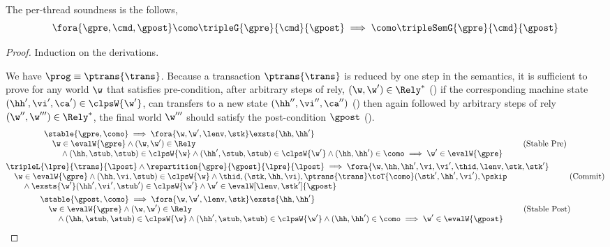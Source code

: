 \begin{thm}
\label{thm:per-thread-soundness}
The per-thread soundness is the follows,
\[
    \fora{\gpre, \cmd, \gpost}
    \como \tripleG{\gpre}{\cmd}{\gpost} 
    \implies 
    \como \tripleSemG{\gpre}{\cmd}{\gpost} 
\]
\end{thm}
\begin{proof}
Induction on the derivations.


We have \( \prog \equiv \ptrans{\trans} \).
Because a transaction \( \ptrans{\trans} \) is reduced by one step in the semantics, it is sufficient to prove for any world \(\w\) that satisfies pre-condition, after arbitrary steps of rely, \ie \( (\w, \w') \in \Rely^{*} \) () if the corresponding machine state \((\hh',\vi', \ca') \in \clpsW{\w'}\), can transfers to a new state \((\hh'',\vi'', \ca'')\) () then again followed by arbitrary steps of rely \((\w'',\w''') \in \Rely^{*} \), the final world \( \w''' \) should satisfy the post-condition \(\gpost\) ().
\begin{gather}
    \begin{array}{@{}l}
    \stable{\gpre, \como}  
    \implies 
    \fora{\w, \w',\lenv, \stk}  
    \exsts{ \hh, \hh' } \\
    \quad \w \in \evalW{\gpre} 
    \land (\w, \w') \in \Rely \\
    \qquad {} \land (\hh, \stub, \stub) \in \clpsW{\w}
    \land (\hh', \stub, \stub) \in \clpsW{\w'}
    \land (\hh, \hh') \in \como
    \implies \w' \in \evalW{\gpre} 
    \end{array} \tag{Stable Pre} \label{equ:stable-pre-condition} \\
%
    \begin{array}{@{}l}
    \tripleL{\lpre}{\trans}{\lpost}
    \land \repartition{\gpre}{\gpost}{\lpre}{\lpost}
    \implies 
    \fora{\w, \hh, \hh', \vi, \vi', \thid, \lenv, \stk, \stk'} \\
    \quad \w \in \evalW{\gpre}
    \land (\hh, \vi, \stub) \in \clpsW{\w} 
    \land \thid, (\stk, \hh, \vi), \ptrans{\trans} 
    \toT{\como} (\stk', \hh', \vi'), \pskip  \\
    \qquad {} \land \exsts{\w'}
    (\hh', \vi', \stub') \in \clpsW{\w'} 
    \land \w' \in \evalW[\lenv, \stk']{\gpost} 
    \end{array} \label{equ:commit-transaction} \tag{Commit} \\
%
    \begin{array}{@{}l}
    \stable{\gpost, \como}  
    \implies 
    \fora{\w, \w',\lenv, \stk}  
    \exsts{ \hh, \hh' } \\
    \quad \w \in \evalW{\gpre} 
    \land (\w, \w') \in \Rely \\
    \qquad {} \land (\hh, \stub, \stub) \in \clpsW{\w}
    \land (\hh', \stub, \stub) \in \clpsW{\w'}
    \land (\hh, \hh') \in \como
    \implies \w' \in \evalW{\gpost} 
    \end{array} \tag{Stable Post} \label{equ:stable-post-condition} 
\end{gather}


\end{proof}
